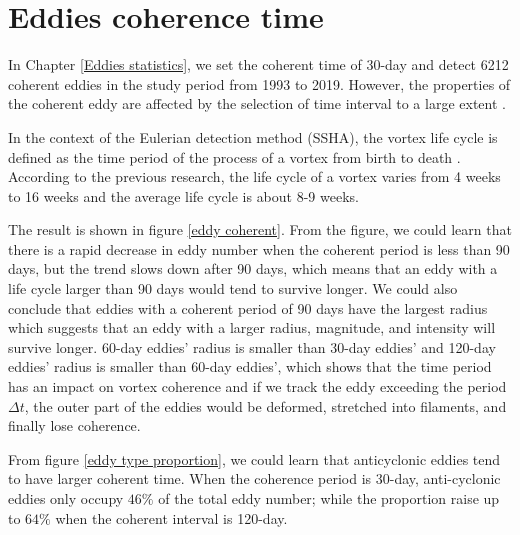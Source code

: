 
\section{Eddies coherence time}

In Chapter \ref{Eddies statistics}, we set the coherent time of 30-day and detect 6212 coherent eddies in the study period from 1993 to 2019. However, the properties of the coherent eddy are affected by the selection of time interval to a large extent \cite{xia2022global,vortmeyer2016detecting}.

In the context of the Eulerian detection method (SSHA), the vortex life cycle is defined as the time period of the process of a vortex from birth to death \cite{mccoy2020global,andrade2020genesis}.
According to the previous research, the life cycle of a vortex varies from 4 weeks to  16 weeks and the average life cycle is about 8-9 weeks.

The result is shown in figure \ref{eddy coherent}. From the figure, we could learn that there is a rapid decrease in eddy number when the coherent period is less than 90 days, but the trend slows down after 90 days, which means that an eddy with a life cycle larger than 90 days would tend to survive longer. We could also conclude that eddies with a coherent period of 90 days have the largest radius which suggests that an eddy with a larger radius, magnitude, and intensity will survive longer. 60-day eddies' radius is smaller than 30-day eddies' and 120-day eddies' radius is smaller than 60-day eddies', which 
shows that the time period has an impact on vortex coherence and if we track the eddy exceeding the period $\Delta t$, the outer part of the eddies would be deformed, stretched into filaments, and finally lose coherence.

From figure \ref{eddy type proportion}, we could learn that anticyclonic eddies tend to have larger coherent time. When the coherence period is 30-day, anti-cyclonic eddies only occupy $46\%$ of the total eddy number; while the proportion raise up to $64\%$ when the coherent interval is 120-day.

